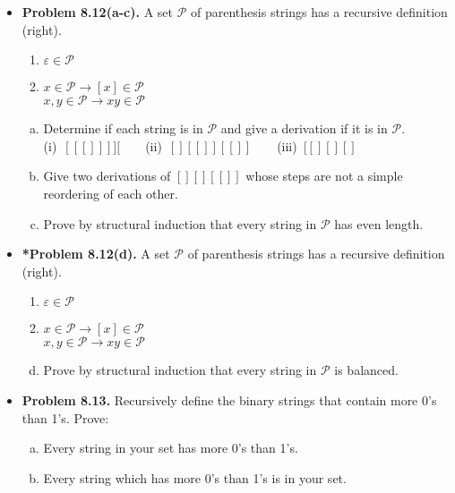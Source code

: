 \documentclass[11pt]{article}
\def\imp{\rightarrow}
\begin{document}
\begin{itemize}
\item \textbf{Problem 8.12(a-c).}
A set $\mathcal{P}$ of parenthesis strings has a recursive definition (right).
\begin{enumerate}[(1)]
\item $\varepsilon\in\mathcal{P}$
\item $x\in\mathcal{P}\imp [x]\in\mathcal{P}$ \\
  $x,y\in\mathcal{P}\imp xy\in\mathcal{P}$
\end{enumerate}
\begin{enumerate}[(a)]
\item Determine if each string is in $\mathcal{P}$ and
  give a derivation if it is in $\mathcal{P}$. \\
  (i)~$[[[]]]][$\ \ \ \ (ii)~$[][[]][[]]$\ \ \ \ (iii)~$[[][][]$
\item Give two derivations of $[][][[]]$ whose steps are not a simple reordering of each other.
\item Prove by structural induction that every string in $\mathcal{P}$ has even length.
\end{enumerate}

\vspace{0.1in}

\item \textbf{*Problem 8.12(d).}
A set $\mathcal{P}$ of parenthesis strings has a recursive definition (right).
\begin{enumerate}[(1)]
\item $\varepsilon\in\mathcal{P}$
\item $x\in\mathcal{P}\imp [x]\in\mathcal{P}$ \\
  $x,y\in\mathcal{P}\imp xy\in\mathcal{P}$
\end{enumerate}
\begin{enumerate}[(a)]
\setcounter{enumi}{3}
\item Prove by structural induction that every string in $\mathcal{P}$ is balanced.
\end{enumerate}

\vspace{0.1in}

\item \textbf{Problem 8.13.}
Recursively define the binary strings that contain more 0's than 1's.
Prove:
\begin{enumerate}[(a)]
\item Every string in your set has more 0's than 1's.
\item Every string which has more 0's than 1's is in your set.
\end{enumerate}


\end{itemize}
\end{document}
